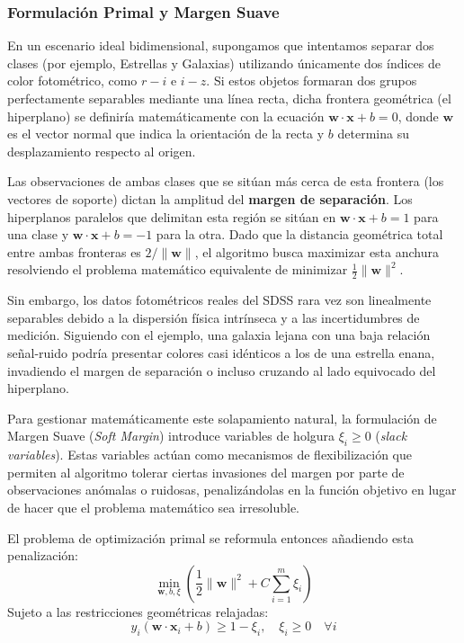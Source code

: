 \documentclass[12pt, a4paper]{report}
\begin{document}
\subsubsection{Formulación Primal y Margen Suave}

En un escenario ideal bidimensional, supongamos que intentamos separar dos clases (por ejemplo, Estrellas y Galaxias) utilizando únicamente dos índices de color fotométrico, como $r-i$ e $i-z$. Si estos objetos formaran dos grupos perfectamente separables mediante una línea recta, dicha frontera geométrica (el hiperplano) se definiría matemáticamente con la ecuación $\mathbf{w} \cdot \mathbf{x} + b = 0$, donde $\mathbf{w}$ es el vector normal que indica la orientación de la recta y $b$ determina su desplazamiento respecto al origen.

Las observaciones de ambas clases que se sitúan más cerca de esta frontera (los vectores de soporte) dictan la amplitud del \textbf{margen de separación}. Los hiperplanos paralelos que delimitan esta región se sitúan en $\mathbf{w} \cdot \mathbf{x} + b = 1$ para una clase y $\mathbf{w} \cdot \mathbf{x} + b = -1$ para la otra. Dado que la distancia geométrica total entre ambas fronteras es $2 / \|\mathbf{w}\|$, el algoritmo busca maximizar esta anchura resolviendo el problema matemático equivalente de minimizar $\frac{1}{2} \| \mathbf{w} \|^2$.

Sin embargo, los datos fotométricos reales del SDSS rara vez son linealmente separables debido a la dispersión física intrínseca y a las incertidumbres de medición. Siguiendo con el ejemplo, una galaxia lejana con una baja relación señal-ruido podría presentar colores casi idénticos a los de una estrella enana, invadiendo el margen de separación o incluso cruzando al lado equivocado del hiperplano. 

Para gestionar matemáticamente este solapamiento natural, la formulación de Margen Suave (\textit{Soft Margin}) introduce variables de holgura $\xi_i \geq 0$ (\textit{slack variables}). Estas variables actúan como mecanismos de flexibilización que permiten al algoritmo tolerar ciertas invasiones del margen por parte de observaciones anómalas o ruidosas, penalizándolas en la función objetivo en lugar de hacer que el problema matemático sea irresoluble.

El problema de optimización primal se reformula entonces añadiendo esta penalización:
\begin{equation}
    \min_{\mathbf{w}, b, \xi} \left( \frac{1}{2} \|\mathbf{w}\|^2 + C \sum_{i=1}^{m} \xi_i \right)
\end{equation}
Sujeto a las restricciones geométricas relajadas:
\begin{equation}
    y_i (\mathbf{w} \cdot \mathbf{x}_i + b) \geq 1 - \xi_i, \quad \xi_i \geq 0 \quad \forall i
\end{equation}
\end{document}
